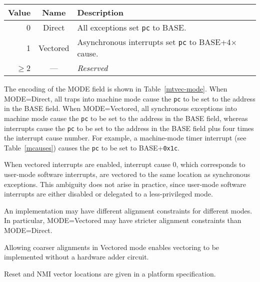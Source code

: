 \begin{table*}[h!]
\begin{center}
\begin{tabular}{|r|c|l|}
\hline
Value & Name & Description \\
\hline	 
0      & Direct   & All exceptions set {\tt pc} to BASE. \\
1      & Vectored & Asynchronous interrupts set {\tt pc} to BASE+4$\times$cause. \\
$\ge$2 & --- & {\em Reserved} \\
\hline
\end{tabular}
\end{center}
\caption{Encoding of {\tt mtvec} MODE field.}
\label{mtvec-mode}
\end{table*}

The encoding of the MODE field is shown in Table~\ref{mtvec-mode}.  When
MODE=Direct, all traps into machine mode cause the {\tt pc} to be set to the
address in the BASE field.  When MODE=Vectored, all synchronous exceptions
into machine mode cause the {\tt pc} to be set to the address in the BASE
field, whereas interrupts cause the {\tt pc} to be set to the address in
the BASE field plus four times the interrupt cause number.  For example,
a machine-mode timer interrupt (see Table~\ref{mcauses}) causes the {\tt pc}
to be set to BASE+{\tt 0x1c}.

\begin{commentary}
When vectored interrupts are enabled, interrupt cause 0, which corresponds to
user-mode software interrupts, are vectored to the same location as
synchronous exceptions.  This ambiguity does not arise in practice, since
user-mode software interrupts are either disabled or delegated to
a less-privileged mode.
\end{commentary}

An implementation may have different alignment constraints for
different modes.  In particular, MODE=Vectored may have stricter
alignment constraints than MODE=Direct.

\begin{commentary}
  Allowing coarser alignments in Vectored mode enables vectoring to be
  implemented without a hardware adder circuit.
\end{commentary}

\begin{commentary}
Reset and NMI vector locations are given in a platform specification.
\end{commentary}

